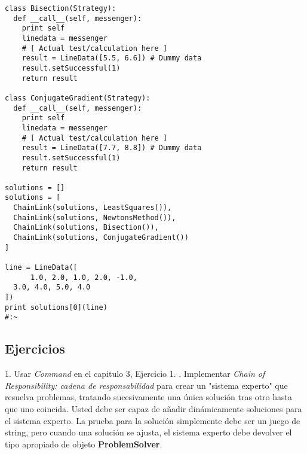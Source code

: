 \begin{lstlisting}
class Bisection(Strategy): 
  def __call__(self, messenger): 
    print self 
    linedata = messenger 
    # [ Actual test/calculation here ] 
    result = LineData([5.5, 6.6]) # Dummy data 
    result.setSuccessful(1) 
    return result 
    
class ConjugateGradient(Strategy): 
  def __call__(self, messenger): 
    print self 
    linedata = messenger 
    # [ Actual test/calculation here ] 
    result = LineData([7.7, 8.8]) # Dummy data 
    result.setSuccessful(1) 
    return result 
    
solutions = [] 
solutions = [ 
  ChainLink(solutions, LeastSquares()), 
  ChainLink(solutions, NewtonsMethod()), 
  ChainLink(solutions, Bisection()), 
  ChainLink(solutions, ConjugateGradient()) 
] 

line = LineData([  
      1.0, 2.0, 1.0, 2.0, -1.0,  
  3.0, 4.0, 5.0, 4.0  
]) 
print solutions[0](line) 
#:~ 
\end{lstlisting}


\subsection*{Ejercicios}
\label{subsec:Ejercicios09}

1. Usar \textit{Command} en el capitulo 3, Ejercicio 1.     . Implementar \textit{Chain of Responsibility: cadena de responsabilidad} para crear un "sistema experto" que resuelva problemas, tratando sucesivamente una única solución tras otro hasta que uno coincida. Usted debe ser capaz de añadir dinámicamente soluciones para el sistema experto. La prueba para la solución simplemente debe ser un juego de string, pero cuando una solución se ajusta, el sistema experto debe devolver el tipo apropiado de objeto \textbf{ProblemSolver}.     \newline
